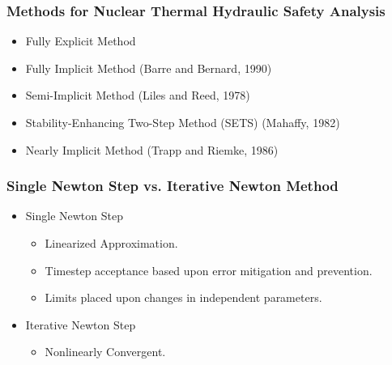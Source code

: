 \documentclass[compress,xcolor=table]{beamer}
\begin{document}
\begin{frame}
\frametitle{Methods for Nuclear Thermal Hydraulic Safety Analysis}

\begin{itemize}
\item{Fully Explicit Method }
\item{Fully Implicit Method (Barre and Bernard, 1990)}
\item{Semi-Implicit Method (Liles and Reed, 1978) }
\item{Stability-Enhancing Two-Step Method (SETS) (Mahaffy, 1982) }
\item{Nearly Implicit Method (Trapp and Riemke, 1986) }
\end{itemize}

\end{frame}
\begin{frame}
\frametitle{Single Newton Step vs. Iterative Newton Method}

\begin{itemize}
\item{Single Newton Step
\begin{itemize}
\item{Linearized Approximation.}
\item{Timestep acceptance based upon error mitigation and prevention.}
\item{Limits placed upon changes in independent parameters.}
\end{itemize}
}
\item{Iterative Newton Step
\begin{itemize}
\item{Nonlinearly Convergent.}
\end{itemize}
}
\end{itemize}

\begin{figure}[t]
\centering
{}
\end{figure}

\end{frame}
\end{document}
